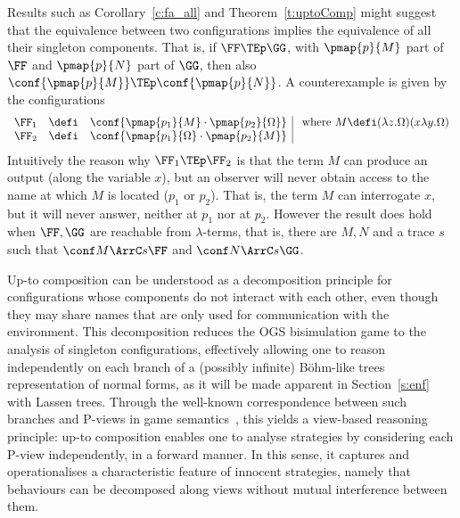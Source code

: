 \begin{remark}
\label{r:CONFnoSINGL} 
Results such as Corollary~\ref{c:fa_all} and 
Theorem~\ref{t:uptoComp} might suggest that the equivalence between
two configurations implies the equivalence of all their singleton 
components. That is, if $\FF \TEp \GG$, with 
$\pmap{p}{M}$ part of $\FF$ and $\pmap{p}{N}$ part of $\GG$, 
then also $\conf {\pmap{p}{M}} \TEp \conf {\pmap{p}{N} }$. 
A counterexample is given by the configurations 
$$
\begin{array}{rcl|l}
\FF_1 & \defi & \conf{ \pmap{p_1}{M}\cdot \pmap{p_2}{\Omega} } 
& \text{ where } M \defi (\lambda z. \Omega)(x \lambda y . \Omega) \\
\FF_2 & \defi & \conf{ \pmap{p_1}{\Omega}\cdot \pmap{p_2}{M} }
& 
\end{array}
 $$ 
Intuitively the reason why $\FF_1 \TEp \FF_2$  is that
the term $M$ can produce an output (along the variable $x$), 
 but an observer  will
never obtain access to  the  name at which $M$ is located
($p_1$ or $p_2$).
That is, the term $M$ can interrogate $x$,
but it will never answer,  neither at $p_1$ nor at $p_2$.
%
However the result does hold when $\FF,\GG$ are reachable from
$\lambda$-terms, that is, there are $M,N$ and a trace $s $ such
that $\conf M \ArrC s  \FF$ and $\conf N \ArrC s \GG$. 
\end{remark} 

\begin{remark}
  \label{rm:up-to-comp-gs}
  Up-to composition can be understood as a decomposition principle for configurations 
  whose components do not interact with each other, even though they may share names 
  that are only used for communication with the environment. 
  This decomposition reduces the OGS bisimulation game to the analysis of singleton configurations, 
  effectively allowing one to reason independently on each branch of a (possibly infinite) 
  Böhm-like trees representation of normal forms, as it will be
  made apparent in Section~\ref{s:enf} with Lassen trees. 
  Through the well-known correspondence between such branches and P-views in game semantics~\cite{curien1998abstract}, 
  this yields a view-based reasoning principle: up-to composition enables one to analyse strategies 
  by considering each P-view independently, in a forward manner. 
  In this sense, it captures and operationalises a characteristic feature of innocent strategies, 
  namely that behaviours can be decomposed along views without mutual interference between them.
\end{remark}


